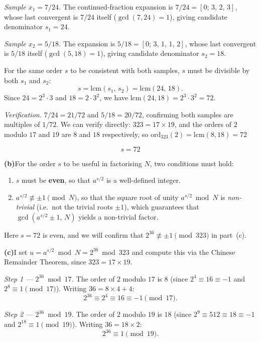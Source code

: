 \documentclass[12pt,a4paper]{article}
\begin{document}
\textit{Sample $x_1=7/24$.} The continued-fraction expansion is
$7/24 = [0;\,3,\,2,\,3]$, whose last convergent is $7/24$ itself ($\gcd(7,24)=1$),
giving candidate denominator $s_1=24$.

\textit{Sample $x_2=5/18$.} The expansion is
$5/18=[0;\,3,\,1,\,1,\,2]$, whose last convergent is $5/18$ itself ($\gcd(5,18)=1$),
giving candidate denominator $s_2=18$.

For the same order $s$ to be consistent with both samples, $s$ must be divisible by both $s_1$ and $s_2$:
\[
  s = \mathrm{lcm}(s_1,\,s_2) = \mathrm{lcm}(24,\,18).
\]
Since $24=2^3\cdot3$ and $18=2\cdot3^2$, we have $\mathrm{lcm}(24,18)=2^3\cdot3^2=72$.

\textit{Verification.} $7/24=21/72$ and $5/18=20/72$, confirming both samples are multiples of $1/72$.
We can verify directly: $323=17\times19$, and the orders of $2$ modulo $17$ and $19$ are $8$ and $18$
respectively, so $\mathrm{ord}_{323}(2)=\mathrm{lcm}(8,18)=72$~\checkmark

\[
  \boxed{s = 72}
\]

\medskip
\noindent\textbf{(b)}\enspace For the order $s$ to be useful in factorising $N$, two conditions must hold:
\begin{enumerate}
  \item $s$ must be \textbf{even}, so that $a^{s/2}$ is a well-defined integer.
  \item $a^{s/2}\not\equiv\pm1\pmod{N}$, so that the square root of unity $a^{s/2}\bmod N$
        is \emph{non-trivial} (i.e.\ not the trivial roots $\pm1$), which guarantees that
        $\gcd(a^{s/2}\pm1,\,N)$ yields a non-trivial factor.
\end{enumerate}
Here $s=72$ is even, and we will confirm that $2^{36}\not\equiv\pm1\pmod{323}$ in part~(c).

\medskip
\noindent\textbf{(c)}\enspace I set $u=a^{s/2}\bmod N = 2^{36}\bmod 323$ and compute this via the Chinese Remainder Theorem,
since $323=17\times19$.

\textit{Step 1 --- $2^{36}\bmod 17$.}
The order of $2$ modulo $17$ is $8$ (since $2^4\equiv16\equiv-1$ and $2^8\equiv1\pmod{17}$).
Writing $36=8\times4+4$:
\[
  2^{36} \equiv 2^4 \equiv 16 \equiv -1 \pmod{17}.
\]

\textit{Step 2 --- $2^{36}\bmod 19$.}
The order of $2$ modulo $19$ is $18$ (since $2^9\equiv512\equiv18\equiv-1$ and $2^{18}\equiv1\pmod{19}$).
Writing $36=18\times2$:
\[
  2^{36} \equiv 1 \pmod{19}.
\]
\end{document}
